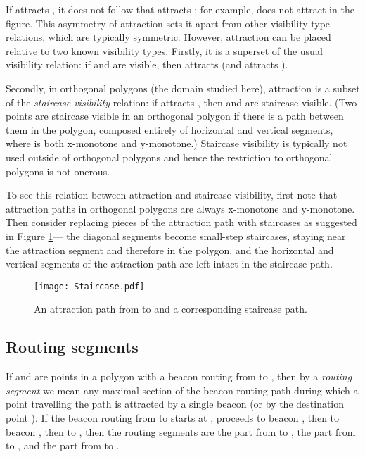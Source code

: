 \documentclass{article}
\begin{document}
		If  attracts , it does not follow that  attracts ; for example,
		 does not attract  in the figure.
		This asymmetry of attraction sets it apart from other visibility-type
		relations, which are typically symmetric.
		However, attraction can be placed relative to two known visibility types.
		Firstly, it is a superset of the usual visibility relation: if  and
		 are visible, then  attracts  (and  attracts ).
		
		Secondly, in orthogonal polygons (the domain studied here), attraction is a
		subset of the \emph{staircase visibility} relation: if  attracts ,
		then  and  are staircase visible.
		(Two points are staircase visible in an orthogonal polygon if there is a path
		 between them in the polygon, composed entirely of horizontal and vertical
		segments, where  is both x-monotone and y-monotone.)
		Staircase visibility is typically not used outside of orthogonal polygons
		and hence the restriction to orthogonal polygons is not onerous.
		
		To see this relation between attraction and staircase visibility, first note
		that attraction paths in orthogonal polygons are always x-monotone and
		y-monotone.  Then consider replacing pieces of the attraction path with
		staircases as suggested in Figure \ref{fig:staircase}---
		the diagonal segments become small-step staircases,
		staying near the attraction segment and therefore in the polygon, and the horizontal and
		vertical segments of the attraction path are left intact in the staircase
		path.
	
		\begin{figure}[htbp] 
			\begin{center}
			    \texttt{[image: Staircase.pdf]} 
			\end{center}
			\caption{
				An attraction path from  to  and a corresponding staircase path.
				}
			\label{fig:staircase}
		\end{figure}
		
	\subsection{Routing segments}
		If  and  are points in a polygon with a beacon routing from  to ,
		then by a \emph{routing segment} we mean any maximal section of the
		beacon-routing path during which a point travelling the path is attracted by
		a single beacon (or by the destination point ).  If the beacon routing from 
		 to  starts at , proceeds to beacon , then to beacon , then 
		to , then the routing segments are the part from  to , the part
		from  to , and the part from  to .
	
\end{document}
